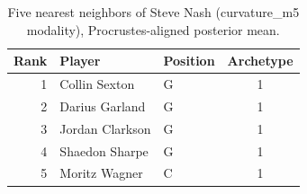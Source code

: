 \begin{table}[htbp]
  \centering\small
  \begin{tabular}{rllc}
    \toprule
    Rank & Player & Position & Archetype \\
    \midrule
    1 & Collin Sexton & G & 1 \\
    2 & Darius Garland & G & 1 \\
    3 & Jordan Clarkson & G & 1 \\
    4 & Shaedon Sharpe & G & 1 \\
    5 & Moritz Wagner & C & 1 \\
    \bottomrule
  \end{tabular}
  \caption{Five nearest neighbors of Steve Nash (curvature_m5 modality), Procrustes-aligned posterior mean.}
  \label{tab:Steve_Nash_neighbors_curvature_m5}
\end{table}

